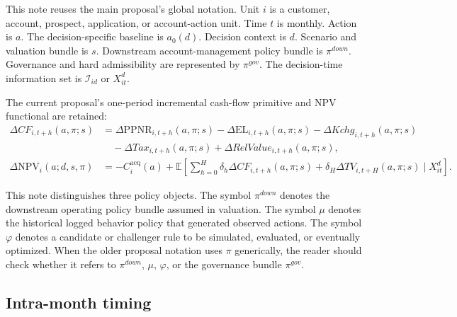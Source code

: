 \documentclass[11pt]{article}
\newcommand{\E}{\mathbb{E}}
\newcommand{\PPNR}{\mathrm{PPNR}}
\newcommand{\EL}{\mathrm{EL}}
\newcommand{\NPV}{\mathrm{NPV}}
\newcommand{\1}{\mathbf{1}}
\theoremstyle{definition}
\begin{document}
This note reuses the main proposal's global notation. Unit $i$ is a customer,
account, prospect, application, or account-action unit. Time $t$ is monthly.
Action is $a$. The decision-specific baseline is $a_0(d)$. Decision context is
$d$. Scenario and valuation bundle is $s$. Downstream account-management policy
bundle is $\pi^{down}$. Governance and hard admissibility are represented by
$\pi^{gov}$. The decision-time information set is $\mathcal{I}_{id}$ or
$X_{it}^{d}$.

The current proposal's one-period incremental cash-flow primitive and NPV
functional are retained:
\begin{align}
  \Delta CF_{i,t+h}(a,\pi;s)
  &=
  \Delta \PPNR_{i,t+h}(a,\pi;s)
  - \Delta \EL_{i,t+h}(a,\pi;s)
  - \Delta Kchg_{i,t+h}(a,\pi;s)
  \nonumber\\
  &\quad
  - \Delta Tax_{i,t+h}(a,\pi;s)
  + \Delta RelValue_{i,t+h}(a,\pi;s),
  \label{eq:cf-primitive}\\
  \Delta \NPV_i(a;d,s,\pi)
  &=
  -C_i^{\mathrm{acq}}(a)
  +
  \E\!\left[
    \sum_{h=0}^{H}\delta_h\Delta CF_{i,t+h}(a,\pi;s)
    + \delta_H\Delta TV_{i,t+H}(a,\pi;s)
    \mid X_{it}^{d}
  \right].
  \label{eq:npv-functional}
\end{align}

This note distinguishes three policy objects. The symbol $\pi^{down}$ denotes
the downstream operating policy bundle assumed in valuation. The symbol $\mu$
denotes the historical logged behavior policy that generated observed actions.
The symbol $\varphi$ denotes a candidate or challenger rule to be simulated,
evaluated, or eventually optimized. When the older proposal notation uses
$\pi$ generically, the reader should check whether it refers to $\pi^{down}$,
$\mu$, $\varphi$, or the governance bundle $\pi^{gov}$.

\subsection{Intra-month timing}
\end{document}
